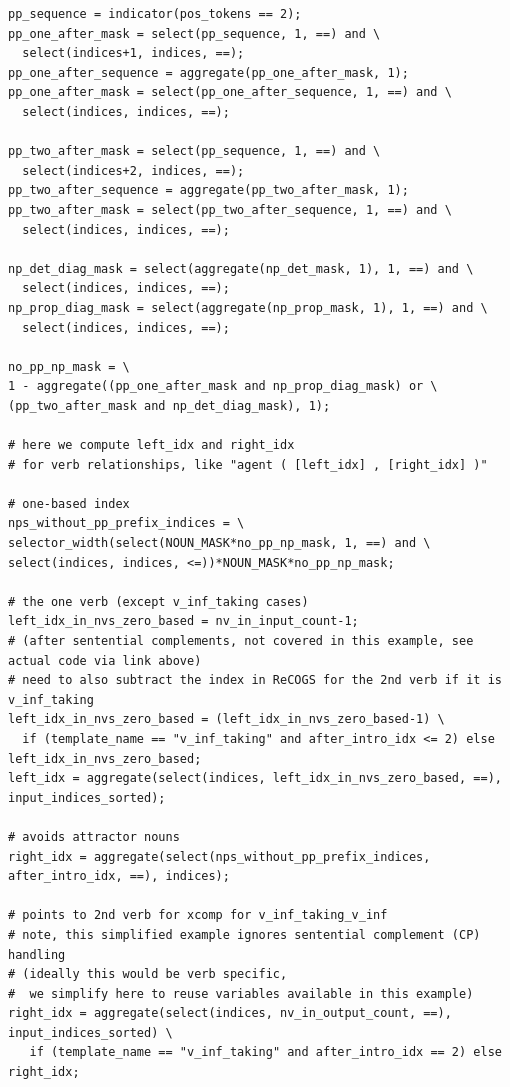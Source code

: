 \documentclass[11pt]{article}
\begin{document}
\begin{tiny}
\begin{verbatim}
pp_sequence = indicator(pos_tokens == 2);
pp_one_after_mask = select(pp_sequence, 1, ==) and \
  select(indices+1, indices, ==);
pp_one_after_sequence = aggregate(pp_one_after_mask, 1);
pp_one_after_mask = select(pp_one_after_sequence, 1, ==) and \
  select(indices, indices, ==);

pp_two_after_mask = select(pp_sequence, 1, ==) and \
  select(indices+2, indices, ==);
pp_two_after_sequence = aggregate(pp_two_after_mask, 1);
pp_two_after_mask = select(pp_two_after_sequence, 1, ==) and \
  select(indices, indices, ==);

np_det_diag_mask = select(aggregate(np_det_mask, 1), 1, ==) and \
  select(indices, indices, ==);
np_prop_diag_mask = select(aggregate(np_prop_mask, 1), 1, ==) and \
  select(indices, indices, ==);

no_pp_np_mask = \
1 - aggregate((pp_one_after_mask and np_prop_diag_mask) or \
(pp_two_after_mask and np_det_diag_mask), 1);

# here we compute left_idx and right_idx
# for verb relationships, like "agent ( [left_idx] , [right_idx] )"

# one-based index
nps_without_pp_prefix_indices = \
selector_width(select(NOUN_MASK*no_pp_np_mask, 1, ==) and \
select(indices, indices, <=))*NOUN_MASK*no_pp_np_mask;

# the one verb (except v_inf_taking cases)
left_idx_in_nvs_zero_based = nv_in_input_count-1;
# (after sentential complements, not covered in this example, see actual code via link above)
# need to also subtract the index in ReCOGS for the 2nd verb if it is v_inf_taking
left_idx_in_nvs_zero_based = (left_idx_in_nvs_zero_based-1) \
  if (template_name == "v_inf_taking" and after_intro_idx <= 2) else left_idx_in_nvs_zero_based;
left_idx = aggregate(select(indices, left_idx_in_nvs_zero_based, ==), input_indices_sorted);

# avoids attractor nouns
right_idx = aggregate(select(nps_without_pp_prefix_indices, after_intro_idx, ==), indices);

# points to 2nd verb for xcomp for v_inf_taking_v_inf
# note, this simplified example ignores sentential complement (CP) handling
# (ideally this would be verb specific,
#  we simplify here to reuse variables available in this example)
right_idx = aggregate(select(indices, nv_in_output_count, ==), input_indices_sorted) \
   if (template_name == "v_inf_taking" and after_intro_idx == 2) else right_idx;


\end{verbatim}
\end{tiny}
\end{document}
